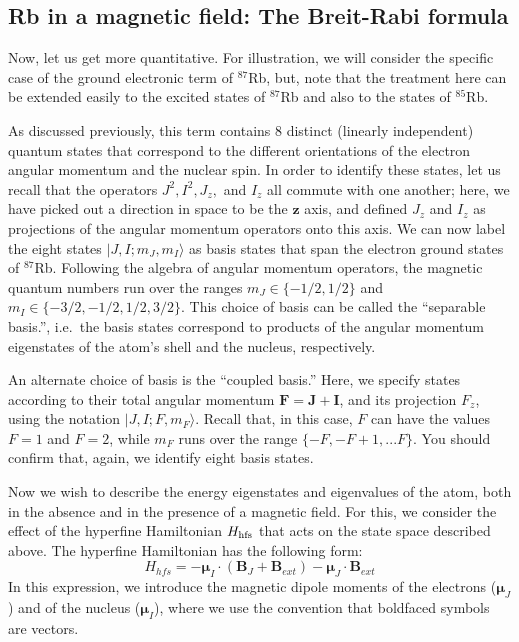 \documentclass{../lab}
\begin{document}
\subsection{Rb in a magnetic field: The Breit-Rabi formula}

Now, let us get more quantitative.  For illustration, we will consider the specific case of the ground electronic term of $^{87}$Rb, but, note that the treatment here can be extended easily to the excited states of $^{87}$Rb and also to the states of $^{85}$Rb.  

As discussed previously, this term contains 8 distinct (linearly independent) quantum states that correspond to the different orientations of the electron angular momentum and the nuclear spin.  In order to identify these states, let us recall that the operators $J^2, I^2, J_z,$ and $I_z$ all commute with one another; here, we have picked out a direction in space to be the $\mathbf{z}$ axis, and defined $J_z$ and $I_z$ as projections of the angular momentum operators onto this axis.  We can now label the eight states $|J,I; m_J, m_I\rangle$ as basis states that span the electron ground states of $^{87}$Rb.  Following the algebra of angular momentum operators, the magnetic quantum numbers run over the ranges $m_J \in \{-1/2, 1/2\}$ and $m_I \in \{-3/2, -1/2, 1/2, 3/2\}$.  This choice of basis can be called the ``separable basis.'', i.e.\, the basis states correspond to products of the angular momentum eigenstates of the atom's shell and the nucleus, respectively.

An alternate choice of basis is the ``coupled basis.''  Here, we specify states according to their total angular momentum $\mathbf{F} = \mathbf{J} + \mathbf{I}$, and its projection $F_z$, using the notation $|J,I; F, m_F\rangle$.  Recall that, in this case, $F$ can have the values $F=1$ and $F=2$, while $m_F$ runs over the range $\{-F, -F+1, ... F\}$.  You should confirm that, again, we identify eight basis states.

Now we wish to describe the energy eigenstates and eigenvalues of the atom, both in the absence and in the presence of a magnetic field.  For this, we consider the effect of the hyperfine Hamiltonian $H_{\rm hfs}$ that acts on the state space described above.  The hyperfine Hamiltonian has the following form:
\begin{equation}
    H_{hfs} = -\boldsymbol{\mu}_I \cdot \left( \mathbf{B}_J + \mathbf{B}_{ext}\right) - \boldsymbol{\mu}_J \cdot \mathbf{B}_{ext}
    \label{eq:Hhfs}
\end{equation}
In this expression, we introduce the magnetic dipole moments of the electrons ($\boldsymbol{\mu}_J$) and of the nucleus ($\boldsymbol{\mu}_I$), where we use the convention that boldfaced symbols are vectors.  
\end{document}
